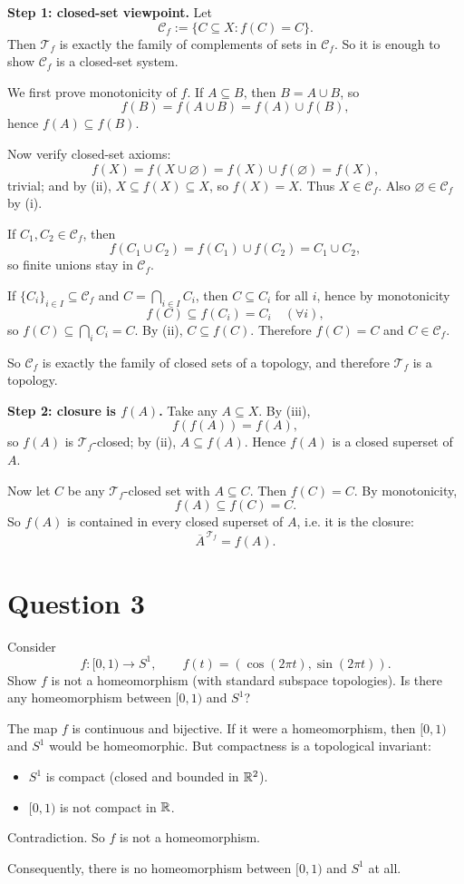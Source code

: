 \documentclass{article}
\begin{document}
\begin{solution}
\textbf{Step 1: closed-set viewpoint.}
Let
\[
\mathcal C_f:=\{C\subseteq X:f(C)=C\}.
\]
Then $\mathcal{T}_f$ is exactly the family of complements of sets in $\mathcal C_f$.
So it is enough to show $\mathcal C_f$ is a closed-set system.

We first prove monotonicity of $f$.
If $A\subseteq B$, then $B=A\cup B$, so
\[
f(B)=f(A\cup B)=f(A)\cup f(B),
\]
hence $f(A)\subseteq f(B)$.

Now verify closed-set axioms:
\[
f(X)=f(X\cup\varnothing)=f(X)\cup f(\varnothing)=f(X),
\]
trivial; and by (ii), $X\subseteq f(X)\subseteq X$, so $f(X)=X$. Thus $X\in\mathcal C_f$.
Also $\varnothing\in\mathcal C_f$ by (i).

If $C_1,C_2\in\mathcal C_f$, then
\[
f(C_1\cup C_2)=f(C_1)\cup f(C_2)=C_1\cup C_2,
\]
so finite unions stay in $\mathcal C_f$.

If $\{C_i\}_{i\in I}\subseteq\mathcal C_f$ and $C=\bigcap_{i\in I}C_i$, then $C\subseteq C_i$ for all $i$, hence by monotonicity
\[
f(C)\subseteq f(C_i)=C_i\quad(\forall i),
\]
so $f(C)\subseteq\bigcap_i C_i=C$. By (ii), $C\subseteq f(C)$. Therefore $f(C)=C$ and $C\in\mathcal C_f$.

So $\mathcal C_f$ is exactly the family of closed sets of a topology, and therefore $\mathcal{T}_f$ is a topology.

\textbf{Step 2: closure is $f(A)$.}
Take any $A\subseteq X$.
By (iii),
\[
f(f(A))=f(A),
\]
so $f(A)$ is $\mathcal{T}_f$-closed; by (ii), $A\subseteq f(A)$.
Hence $f(A)$ is a closed superset of $A$.

Now let $C$ be any $\mathcal{T}_f$-closed set with $A\subseteq C$.
Then $f(C)=C$. By monotonicity,
\[
f(A)\subseteq f(C)=C.
\]
So $f(A)$ is contained in every closed superset of $A$, i.e. it is the closure:
\[
\overline A^{\,\mathcal{T}_f}=f(A).
\]
\end{solution}

\section{Question 3}

Consider
\[
f:[0,1)\to S^1,\qquad f(t)=(\cos(2\pi t),\sin(2\pi t)).
\]
Show $f$ is not a homeomorphism (with standard subspace topologies). Is there any homeomorphism between $[0,1)$ and $S^1$?

\begin{solution}
The map $f$ is continuous and bijective.
If it were a homeomorphism, then $[0,1)$ and $S^1$ would be homeomorphic.
But compactness is a topological invariant:
\begin{itemize}
\item $S^1$ is compact (closed and bounded in $\mathbb{R}^2$).
\item $[0,1)$ is not compact in $\mathbb{R}$.
\end{itemize}
Contradiction. So $f$ is not a homeomorphism.

Consequently, there is no homeomorphism between $[0,1)$ and $S^1$ at all.
\end{solution}
\end{document}
